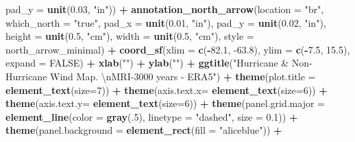 \documentclass[12pt,twoside]{reedthesis}
\newenvironment{Shaded}{\begin{snugshade}}{\end{snugshade}}
\newcommand{\CharTok}[1]{\textcolor[rgb]{0.31,0.60,0.02}{#1}}
\newcommand{\DataTypeTok}[1]{\textcolor[rgb]{0.13,0.29,0.53}{#1}}
\newcommand{\DecValTok}[1]{\textcolor[rgb]{0.00,0.00,0.81}{#1}}
\newcommand{\FloatTok}[1]{\textcolor[rgb]{0.00,0.00,0.81}{#1}}
\newcommand{\KeywordTok}[1]{\textcolor[rgb]{0.13,0.29,0.53}{\textbf{#1}}}
\newcommand{\NormalTok}[1]{#1}
\newcommand{\OperatorTok}[1]{\textcolor[rgb]{0.81,0.36,0.00}{\textbf{#1}}}
\newcommand{\OtherTok}[1]{\textcolor[rgb]{0.56,0.35,0.01}{#1}}
\newcommand{\StringTok}[1]{\textcolor[rgb]{0.31,0.60,0.02}{#1}}
\begin{document}
\begin{Shaded}
\begin{Highlighting}[]
   \DataTypeTok{pad_y =} \KeywordTok{unit}\NormalTok{(}\FloatTok{0.03}\NormalTok{, }\StringTok{"in"}\NormalTok{)) }\OperatorTok{+}\StringTok{ }
\StringTok{  }\KeywordTok{annotation_north_arrow}\NormalTok{(}\DataTypeTok{location =} \StringTok{"br"}\NormalTok{, }\DataTypeTok{which_north =} \StringTok{"true"}\NormalTok{, }\DataTypeTok{pad_x =} \KeywordTok{unit}\NormalTok{(}\FloatTok{0.01}\NormalTok{, }\StringTok{"in"}\NormalTok{), }\DataTypeTok{pad_y =} \KeywordTok{unit}\NormalTok{(}\FloatTok{0.02}\NormalTok{, }\StringTok{"in"}\NormalTok{), }\DataTypeTok{height =} \KeywordTok{unit}\NormalTok{(}\FloatTok{0.5}\NormalTok{, }\StringTok{"cm"}\NormalTok{), }
   \DataTypeTok{width =} \KeywordTok{unit}\NormalTok{(}\FloatTok{0.5}\NormalTok{, }\StringTok{"cm"}\NormalTok{), }\DataTypeTok{style =}\NormalTok{ north_arrow_minimal) }\OperatorTok{+}
\StringTok{  }\KeywordTok{coord_sf}\NormalTok{(}\DataTypeTok{xlim =} \KeywordTok{c}\NormalTok{(}\OperatorTok{-}\FloatTok{82.1}\NormalTok{, }\FloatTok{-63.8}\NormalTok{), }\DataTypeTok{ylim =} \KeywordTok{c}\NormalTok{(}\OperatorTok{-}\FloatTok{7.5}\NormalTok{, }\FloatTok{15.5}\NormalTok{), }\DataTypeTok{expand =} \OtherTok{FALSE}\NormalTok{) }\OperatorTok{+}
\StringTok{  }\KeywordTok{xlab}\NormalTok{(}\StringTok{""}\NormalTok{) }\OperatorTok{+}\StringTok{ }
\StringTok{  }\KeywordTok{ylab}\NormalTok{(}\StringTok{""}\NormalTok{) }\OperatorTok{+}\StringTok{ }
\StringTok{  }\KeywordTok{ggtitle}\NormalTok{(}\StringTok{"Hurricane & Non-Hurricane Wind Map. }\CharTok{\textbackslash{}n}\StringTok{MRI-3000 years - ERA5"}\NormalTok{) }\OperatorTok{+}\StringTok{ }
\StringTok{  }\KeywordTok{theme}\NormalTok{(}\DataTypeTok{plot.title =} \KeywordTok{element_text}\NormalTok{(}\DataTypeTok{size=}\DecValTok{7}\NormalTok{)) }\OperatorTok{+}
\StringTok{  }\KeywordTok{theme}\NormalTok{(}\DataTypeTok{axis.text.x=} \KeywordTok{element_text}\NormalTok{(}\DataTypeTok{size=}\DecValTok{6}\NormalTok{)) }\OperatorTok{+}\StringTok{ }
\StringTok{  }\KeywordTok{theme}\NormalTok{(}\DataTypeTok{axis.text.y=} \KeywordTok{element_text}\NormalTok{(}\DataTypeTok{size=}\DecValTok{6}\NormalTok{)) }\OperatorTok{+}
\StringTok{  }\KeywordTok{theme}\NormalTok{(}\DataTypeTok{panel.grid.major =} \KeywordTok{element_line}\NormalTok{(}\DataTypeTok{color =} \KeywordTok{gray}\NormalTok{(.}\DecValTok{5}\NormalTok{), }\DataTypeTok{linetype =} \StringTok{"dashed"}\NormalTok{, }\DataTypeTok{size =} \FloatTok{0.1}\NormalTok{)) }\OperatorTok{+}
\StringTok{  }\KeywordTok{theme}\NormalTok{(}\DataTypeTok{panel.background =} \KeywordTok{element_rect}\NormalTok{(}\DataTypeTok{fill =} \StringTok{"aliceblue"}\NormalTok{)) }\OperatorTok{+}

\end{Highlighting}
\end{Shaded}
\end{document}
